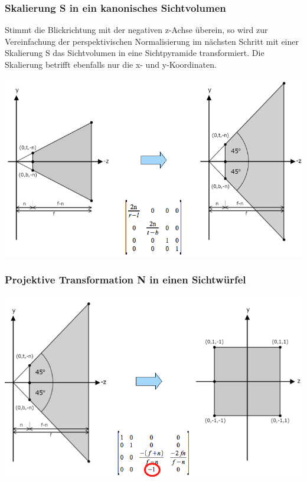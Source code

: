 \documentclass[10pt]{article}
\begin{document}
\subsubsection{Skalierung S in ein kanonisches Sichtvolumen}
Stimmt die Blickrichtung mit der negativen z-Achse überein, so wird zur Vereinfachung der perspektivischen Normalisierung im nächsten Schritt mit einer Skalierung S das Sichtvolumen in eine Sichtpyramide transformiert. Die Skalierung betrifft ebenfalls nur die x- und y-Koordinaten.
\begin{center}
	\includegraphics[scale=0.2]{projektionstransformation2.png}
\end{center}
\subsubsection{Projektive Transformation N in einen Sichtwürfel }
\begin{center}
	\includegraphics[scale=0.2]{projektionstransformation3.png}
\end{center}
\end{document}
